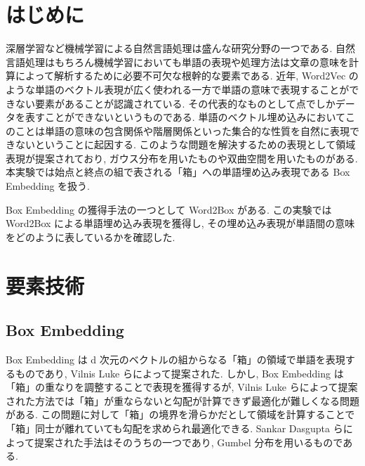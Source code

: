 \documentclass[twocolumn]{jarticle}     %
\begin{document}

\section{はじめに}
深層学習など機械学習による自然言語処理は盛んな研究分野の一つである. 
自然言語処理はもちろん機械学習においても単語の表現や処理方法は文章の意味を計算によって解析するために必要不可欠な根幹的な要素である.
近年, Word2Vec のような単語のベクトル表現が広く使われる一方で単語の意味で表現することができない要素があることが認識されている. 
その代表的なものとして点でしかデータを表すことができないというものである. 
単語のベクトル埋め込みにおいてこのことは単語の意味の包含関係や階層関係といった集合的な性質を自然に表現できないということに起因する. 
このような問題を解決するための表現として領域表現が提案されており, ガウス分布を用いたものや双曲空間を用いたものがある. 
本実験では始点と終点の組で表される「箱」への単語埋め込み表現である Box Embedding を扱う. 

Box Embedding の獲得手法の一つとして Word2Box がある. 
この実験では Word2Box による単語埋め込み表現を獲得し, その埋め込み表現が単語間の意味をどのように表しているかを確認した. 

\section{要素技術}
\subsection{Box Embedding}
Box Embedding は d 次元のベクトルの組からなる「箱」の領域で単語を表現するものであり, Vilnis Luke ら\cite{box-lattice}によって提案された.
しかし, Box Embedding は「箱」の重なりを調整することで表現を獲得するが, Vilnis Luke らによって提案された方法では「箱」が重ならないと勾配が計算できず最適化が難しくなる問題がある.
この問題に対して「箱」の境界を滑らかだとして領域を計算することで「箱」同士が離れていても勾配を求められ最適化できる. 
Sankar Dasgupta ら\cite{gumbel-box}によって提案された手法はそのうちの一つであり, Gumbel 分布を用いるものである. 
\end{document}

